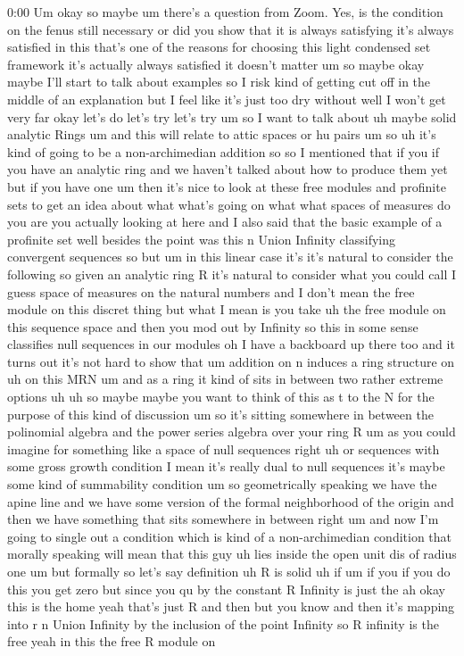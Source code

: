 \begin{unfinished}{0:00}
Um okay so maybe um there's a question from Zoom. Yes, is the condition on the fenus still necessary or did you show that it is always satisfying it's always satisfied in this that's one of the reasons for choosing this light condensed set framework it's actually always satisfied it doesn't matter um so maybe okay maybe I'll start to talk about examples so I risk kind of getting cut off in the middle of an explanation but I feel like it's just too dry without well I won't get very far okay let's do let's try let's try um so I want to talk about uh maybe solid analytic Rings um and this will relate to attic spaces or hu pairs um so uh it's kind of going to be a non-archimedian addition so so I mentioned that if you if you have an analytic ring and we haven't talked about how to produce them yet but if you have one um then it's nice to look at these free modules and profinite sets to get an idea about what what's going on what what spaces of measures do you are you actually looking at here and I also said that the basic example of a profinite set well besides the point was this n Union Infinity classifying convergent sequences so but um in this linear case it's it's natural to consider the following so given an analytic ring R it's natural to consider what you could call I guess space of measures on the natural numbers and I don't mean the free module on this discret thing but what I mean is you take uh the free module on this sequence space and then you mod out by Infinity so this in some sense classifies null sequences in our modules oh I have a backboard up there too and it turns out it's not hard to show that um addition on n induces a ring structure on uh on this MRN um and as a ring it kind of sits in between two rather extreme options uh uh so maybe maybe you want to think of this as t to the N for the purpose of this kind of discussion um so it's sitting somewhere in between the polinomial algebra and the power series algebra over your ring R um as you could imagine for something like a space of null sequences right uh or sequences with some gross growth condition I mean it's really dual to null sequences it's maybe some kind of summability condition um so geometrically speaking we have the apine line and we have some version of the formal neighborhood of the origin and then we have something that sits somewhere in between right um and now I'm going to single out a condition which is kind of a non-archimedian condition that morally speaking will mean that this guy uh lies inside the open unit dis of radius one um but formally so let's say definition uh R is solid uh if um if you if you do this you get zero but since you qu by the constant R Infinity is just the ah okay this is the home yeah that's just R and then but you know and then it's mapping into r n Union Infinity by the inclusion of the point Infinity so R infinity is the free yeah in this the free R module on


\end{unfinished}
